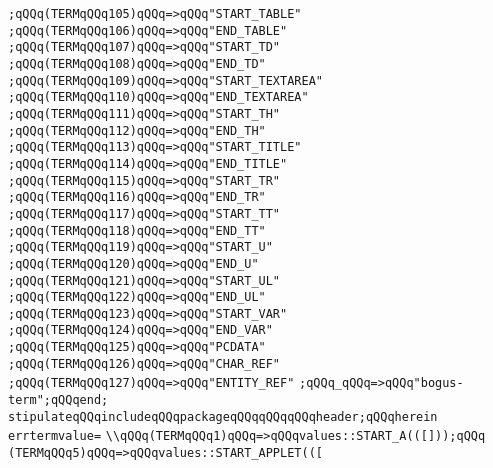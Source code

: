 \verb|;qQQq(TERMqQQq105)qQQq=>qQQq"START_TABLE"|\newline
\verb|;qQQq(TERMqQQq106)qQQq=>qQQq"END_TABLE"|\newline
\verb|;qQQq(TERMqQQq107)qQQq=>qQQq"START_TD"|\newline
\verb|;qQQq(TERMqQQq108)qQQq=>qQQq"END_TD"|\newline
\verb|;qQQq(TERMqQQq109)qQQq=>qQQq"START_TEXTAREA"|\newline
\verb|;qQQq(TERMqQQq110)qQQq=>qQQq"END_TEXTAREA"|\newline
\verb|;qQQq(TERMqQQq111)qQQq=>qQQq"START_TH"|\newline
\verb|;qQQq(TERMqQQq112)qQQq=>qQQq"END_TH"|\newline
\verb|;qQQq(TERMqQQq113)qQQq=>qQQq"START_TITLE"|\newline
\verb|;qQQq(TERMqQQq114)qQQq=>qQQq"END_TITLE"|\newline
\verb|;qQQq(TERMqQQq115)qQQq=>qQQq"START_TR"|\newline
\verb|;qQQq(TERMqQQq116)qQQq=>qQQq"END_TR"|\newline
\verb|;qQQq(TERMqQQq117)qQQq=>qQQq"START_TT"|\newline
\verb|;qQQq(TERMqQQq118)qQQq=>qQQq"END_TT"|\newline
\verb|;qQQq(TERMqQQq119)qQQq=>qQQq"START_U"|\newline
\verb|;qQQq(TERMqQQq120)qQQq=>qQQq"END_U"|\newline
\verb|;qQQq(TERMqQQq121)qQQq=>qQQq"START_UL"|\newline
\verb|;qQQq(TERMqQQq122)qQQq=>qQQq"END_UL"|\newline
\verb|;qQQq(TERMqQQq123)qQQq=>qQQq"START_VAR"|\newline
\verb|;qQQq(TERMqQQq124)qQQq=>qQQq"END_VAR"|\newline
\verb|;qQQq(TERMqQQq125)qQQq=>qQQq"PCDATA"|\newline
\verb|;qQQq(TERMqQQq126)qQQq=>qQQq"CHAR_REF"|\newline
\verb|;qQQq(TERMqQQq127)qQQq=>qQQq"ENTITY_REF"|\newline
\verb|;qQQq_qQQq=>qQQq"bogus-term";qQQqend;|\newline
\verb|stipulateqQQqincludeqQQqpackageqQQqqQQqqQQqheader;qQQqherein|\newline
\verb|errtermvalue=|\newline
\verb|\\qQQq(TERMqQQq1)qQQq=>qQQqvalues::START_A(([]));qQQq|\newline
\verb|(TERMqQQq5)qQQq=>qQQqvalues::START_APPLET(([|\newline
